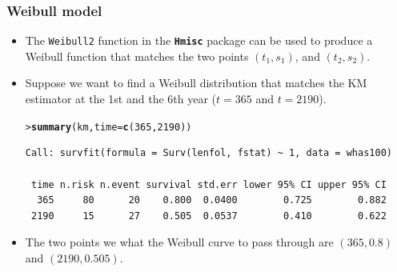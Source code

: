 \documentclass[10pt]{beamer}\usepackage[]{graphicx}\usepackage[]{color}
\makeatletter
\newcommand{\hlnum}[1]{\textcolor[rgb]{0.686,0.059,0.569}{#1}}%
\newcommand{\hlstd}[1]{\textcolor[rgb]{0.345,0.345,0.345}{#1}}%
\newcommand{\hlkwc}[1]{\textcolor[rgb]{0.333,0.667,0.333}{#1}}%
\newcommand{\hlkwd}[1]{\textcolor[rgb]{0.737,0.353,0.396}{\textbf{#1}}}%
\newenvironment{kframe}{%
 \def\at@end@of@kframe{}%
 \ifinner\ifhmode%
  \def\at@end@of@kframe{\end{minipage}}%
  \begin{minipage}{\columnwidth}%
 \fi\fi%
 \def\FrameCommand##1{\hskip\@totalleftmargin \hskip-\fboxsep
 \colorbox{shadecolor}{##1}\hskip-\fboxsep
     \hskip-\linewidth \hskip-\@totalleftmargin \hskip\columnwidth}%
 \MakeFramed {\advance\hsize-\width
   \@totalleftmargin\z@ \linewidth\hsize
   \@setminipage}}%
 {\par\unskip\endMakeFramed%
 \at@end@of@kframe}
\newenvironment{knitrout}{}{} %
\renewenvironment{knitrout}{\setlength{\topsep}{-.2mm}}{}
\newcommand{\pkg}[1]{{\textbf{\texttt{#1}}}}
\newcommand{\code}[1]{{\texttt{#1}}}
\newcommand{\Skm}{\widehat{S}_{\scriptsize{KM}}}
\makeatother
\begin{document}
\begin{frame}[fragile]
  \frametitle{Weibull model}
  \begin{itemize}
  \item The \code{Weibull2} function in the \pkg{Hmisc} package can be
    used to produce a Weibull function that matches the two points
    $(t_1, s_1)$, and $(t_2, s_2)$.
\item Suppose we want to find a Weibull distribution that
  matches the KM estimator at the 1st and the 6th year
  ($t = 365$ and $t = 2190$).
\begin{knitrout}\scriptsize
{}\color{fgcolor}\begin{kframe}
\begin{alltt}
\hlstd{> }\hlkwd{summary}\hlstd{(km,} \hlkwc{time} \hlstd{=} \hlkwd{c}\hlstd{(}\hlnum{365}\hlstd{,} \hlnum{2190}\hlstd{))}
\end{alltt}
\begin{verbatim}
Call: survfit(formula = Surv(lenfol, fstat) ~ 1, data = whas100)

 time n.risk n.event survival std.err lower 95% CI upper 95% CI
  365     80      20    0.800  0.0400        0.725        0.882
 2190     15      27    0.505  0.0537        0.410        0.622
\end{verbatim}
\end{kframe}
\end{knitrout}
\item The two points we what the Weibull curve to pass through are $(365, 0.8)$ and $(2190, 0.505)$.
\end{itemize}
\end{frame}
\end{document}
